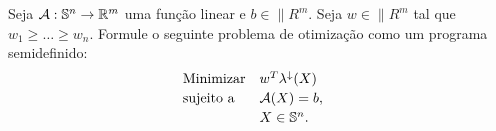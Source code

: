 \begin{homeworkProblem}
Seja $\"{A}: \|{S}^n \rightarrow \|{R}^m$ uma função linear e $b \in \|{R}^m$. Seja $w \in \|{R}^m$ tal que $w_1 \geq \dots \geq w_n$. Formule o seguinte problema de otimização como um programa semidefinido:
\begin{equation*}
    \begin{array}[!h]{lll}
        \text{Minimizar} & w^T \eigen(X)                                    & \\[2pt]
        \text{sujeito a} & \"{A}(X) = b,                                    & \\[2pt]
                         & X \in \|{S}^n.                                   & \\
    \end{array}
\end{equation*}
\end{homeworkProblem}

